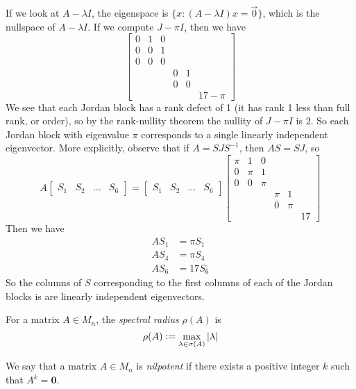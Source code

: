 \begin{example}
\noindent If we look at $A - \lambda I$, the eigenspace is $\{x: (A-\lambda I)x = \Vec{0}\}$, which is the nullspace of $A - \lambda I$. If we compute $J - \pi I$, then we have
$$
    \begin{bmatrix}
       0 & 1 & 0 & & & \\
       0 & 0 & 1 & & & \\
       0 & 0 & 0 & & & \\
         & & & 0 & 1 & \\
         & & & 0 & 0 & \\
         & & & & & 17 - \pi
    \end{bmatrix}
$$
We see that each Jordan block has a rank defect of 1 (it has rank 1 less than full rank, or order), so by the rank-nullity theorem the nullity of $J - \pi I$ is 2. So each Jordan block with eigenvalue $\pi$ corresponds to a single linearly independent eigenvector. More explicitly, observe that if $A = SJS^{-1}$, then $AS = SJ$, so
$$
A [\begin{array}{c|c|c|c} S_1 & S_2 & \dots & S_6 \end{array}] 
= [\begin{array}{c|c|c|c} S_1 & S_2 & \dots & S_6 \end{array}]
    \begin{bmatrix}
      \pi & 1 & 0 & & & \\
       0 & \pi & 1 & & & \\
       0 & 0 & \pi & & & \\
         & & & \pi & 1 & \\
         & & & 0 & \pi & \\
         & & & & & 17
    \end{bmatrix}
$$
Then we have
\begin{align*}
    AS_1 &= \pi S_1 \\
    AS_4 &= \pi S_4 \\
    AS_6 &= 17 S_6
\end{align*}
So the columns of $S$ corresponding to the first columns of each of the Jordan blocks is are linearly independent eigenvectors.
\end{example}

\begin{definition}
\label{def:spectral-radius}
For a matrix $A \in M_n$, the \textit{spectral radius} $\rho(A)$ is
$$
\rho(A) \vcentcolon= \max_{\lambda \in \sigma(A)} |\lambda|
$$
\end{definition}

\begin{definition}[Nilpotent]
\label{def:nilpotent}
We say that a matrix $A \in M_n$ is \textit{nilpotent} if there exists a positive integer $k$ such that $A^k = \mathbf{0}$.
\end{definition}

